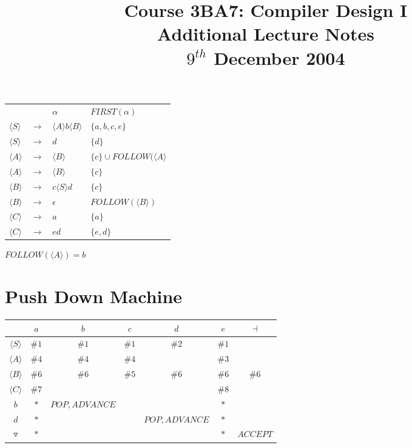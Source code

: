\documentclass[a4paper,12pt]{article}
\newcommand{\nonterminal}[1]{\langle #1 \rangle}
\begin{document}
\title{Course 3BA7: Compiler Design I \\ Additional Lecture Notes \\ $9^{th}$ December 2004}

\maketitle

\begin{tabular}{llll}
						&			&	$\alpha$											&	$FIRST(\alpha)$\\
$\nonterminal{S}$	&	$\to$	&	$\nonterminal{A} b \nonterminal{B}$		&	$\{a, b, c, e\}$	\\
$\nonterminal{S}$	&	$\to$	&	$d$ 												&	$\{d\}$				\\
$\nonterminal{A}$	&	$\to$	&	$\nonterminal{B}$ 							&	$\{c\} \cup FOLLOW(\nonterminal{A}$	\\
$\nonterminal{A}$	&	$\to$	&	$\nonterminal{B}$								&	$\{c\}$				\\
$\nonterminal{B}$	&	$\to$	&	$c \nonterminal{S} d$						&	$\{c\}$				\\
$\nonterminal{B}$	&	$\to$	&	$\epsilon$										&	$FOLLOW(\nonterminal{B})$	\\
$\nonterminal{C}$	&	$\to$	&	$a$												&	$\{a\}$				\\
$\nonterminal{C}$	&	$\to$	&	$e d$												&	$\{e, d\}$			\\
\end{tabular}


$FOLLOW(\nonterminal{A}) = {b}$

\section*{Push Down Machine}

\begin{tabular}{|c|c|c|c|c|c|c|}
\hline
						&	$a$	&	$b$	&	$c$	&	$d$	&	$e$	&	$\dashv$		\\
\hline
$\nonterminal{S}$	&	$\#1$	&	$\#1$	&	$\#1$	&	$\#2$	&	$\#1$	&					\\
\hline
$\nonterminal{A}$	&	$\#4$	&	$\#4$	&	$\#4$	&			&	$\#3$	&					\\
\hline
$\nonterminal{B}$	&	$\#6$&	$\#6$	&	$\#5$	&	$\#6$	&	$\#6$&	$\#6$			\\
\hline
$\nonterminal{C}$	&	$\#7$	&			&			&			&	$\#8$	&					\\
\hline
$b$					&	$\ast$&	$POP,ADVANCE$&	&			&	$\ast$&					\\
\hline
$d$					&	$\ast$&			&			&	$POP, ADVANCE$	&	$\ast$	&	\\
\hline
$\triangledown$	&	$\ast$&			&			&			&	$\ast$	&	$ACCEPT$	\\
\hline
\end{tabular}
\end{document}
